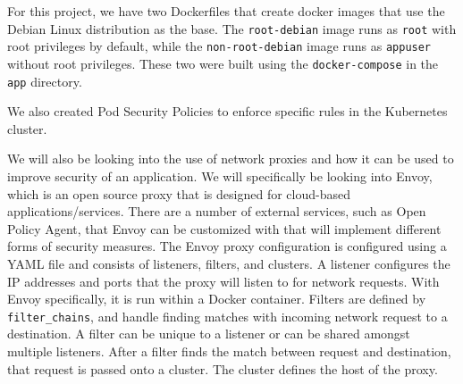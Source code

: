 For this project, we have two Dockerfiles that create docker images that use the Debian Linux distribution
as the base. The \verb|root-debian| image runs as \verb|root| with root privileges by 
default, while the \verb|non-root-debian| image runs as \verb|appuser| without root privileges.
These two were built using the \verb|docker-compose| in the \verb|app| directory.

We also created Pod Security Policies to enforce specific rules in the Kubernetes cluster.

We will also be looking into the use of network proxies and how it can be used to improve security
of an application. We will specifically be looking into Envoy, which is an open source proxy that is designed
for cloud-based applications/services. There are a number of external services, such as Open Policy Agent,
that Envoy can be customized with that will implement different forms of security measures. The Envoy proxy
configuration is configured using a YAML file and consists of listeners, filters, and clusters. A listener
configures the IP addresses and ports that the proxy will listen to for network requests. With Envoy specifically,
it is run within a Docker container. Filters are defined by \verb|filter_chains|, and handle finding matches with incoming
network request to a destination. A filter can be unique to a listener or can be shared amongst multiple listeners.
After a filter finds the match between request and destination, that request is passed onto a cluster. The cluster
defines the host of the proxy.
